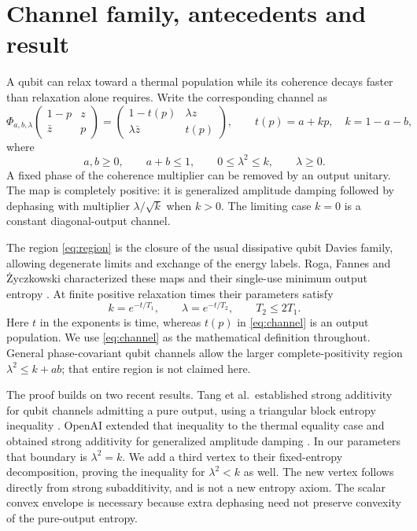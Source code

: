 \documentclass[11pt]{article}
\begin{document}
\section{Channel family, antecedents and result}
A qubit can relax toward a thermal population while its coherence decays faster than relaxation alone requires. Write the corresponding channel as
\begin{equation}\label{eq:channel}
 \Phi_{a,b,\lambda}
 \begin{pmatrix}1-p&z\\\bar z&p\end{pmatrix}
 =
 \begin{pmatrix}1-t(p)&\lambda z\\\lambda\bar z&t(p)\end{pmatrix},
 \qquad t(p)=a+kp,\quad k=1-a-b,
\end{equation}
where
\begin{equation}\label{eq:region}
 a,b\ge0,\qquad a+b\le1,\qquad 0\le\lambda^2\le k,\qquad\lambda\ge0.
\end{equation}
A fixed phase of the coherence multiplier can be removed by an output unitary. The map is completely positive: it is generalized amplitude damping followed by dephasing with multiplier $\lambda/\sqrt{k}$ when $k>0$. The limiting case $k=0$ is a constant diagonal-output channel.

The region \eqref{eq:region} is the closure of the usual dissipative qubit Davies family, allowing degenerate limits and exchange of the energy labels. Roga, Fannes and \.{Z}yczkowski characterized these maps and their single-use minimum output entropy \cite{roga}. At finite positive relaxation times their parameters satisfy
\[
 k=e^{-t/T_1},\qquad \lambda=e^{-t/T_2},\qquad T_2\le2T_1.
\]
Here $t$ in the exponents is time, whereas $t(p)$ in \eqref{eq:channel} is an output population. We use \eqref{eq:channel} as the mathematical definition throughout. General phase-covariant qubit channels allow the larger complete-positivity region $\lambda^2\le k+ab$; that entire region is not claimed here.

The proof builds on two recent results. Tang et al.\ established strong additivity for qubit channels admitting a pure output, using a triangular block entropy inequality \cite{tang}. OpenAI extended that inequality to the thermal equality case and obtained strong additivity for generalized amplitude damping \cite{openai}. In our parameters that boundary is $\lambda^2=k$. We add a third vertex to their fixed-entropy decomposition, proving the inequality for $\lambda^2<k$ as well. The new vertex follows directly from strong subadditivity, and is not a new entropy axiom. The scalar convex envelope is necessary because extra dephasing need not preserve convexity of the pure-output entropy.
\end{document}
